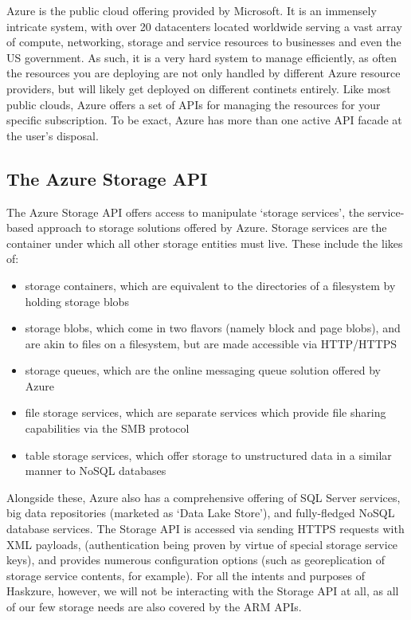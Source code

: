 \documentclass[11pt]{report}
\begin{document}
Azure is the public cloud offering provided by Microsoft. It is an immensely
intricate system, with over 20 datacenters located worldwide serving a vast
array of compute, networking, storage and service resources to businesses and
even the US government. As such, it is a very hard system to manage
efficiently, as often the resources you are deploying are not only handled by
different Azure resource providers, but will likely get deployed on different
continets entirely. \newline
Like most public clouds, Azure offers a set of APIs for managing the resources
for your specific subscription. To be exact, Azure has more than one active API
facade at the user's disposal.

\subsection{The Azure Storage API}

The Azure Storage API offers access to manipulate `storage services', the
service-based approach to storage solutions offered by Azure. Storage services
are the container under which all other storage entities must live.
These include the likes of:
\begin{itemize}
    \item{} storage containers, which are equivalent to the directories of a
        filesystem by holding storage blobs
    \item{} storage blobs, which come in two flavors (namely block and page
        blobs), and are akin to files on a filesystem, but are made
        accessible via HTTP/HTTPS
    \item{} storage queues, which are the online messaging queue solution
        offered by Azure
    \item{} file storage services, which are separate services which provide
        file sharing capabilities via the SMB protocol
    \item{} table storage services, which offer storage to unstructured data
        in a similar manner to NoSQL databases
\end{itemize}
Alongside these, Azure also has a comprehensive offering of SQL Server
services, big data repositories (marketed as `Data Lake Store'), and
fully-fledged NoSQL database services. \newline
The Storage API is accessed via sending HTTPS requests with XML payloads,
(authentication being proven by virtue of special storage service keys), and
provides numerous configuration options (such as georeplication of storage
service contents, for example). For all the intents and purposes of Haskzure,
however, we will not be interacting with the Storage API at all, as all of our
few storage needs are also covered by the ARM APIs.
\end{document}
